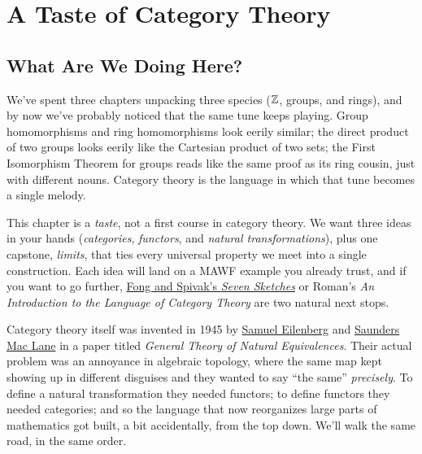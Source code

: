 

\chapter{A Taste of Category Theory}

\section{What Are We Doing Here?}\label{sec:ch4-intro}
We've spent three chapters unpacking three species (${\mathbb{Z}}$, groups, and rings), and by now
we've probably noticed that the same tune keeps playing. Group homomorphisms and ring
homomorphisms look eerily similar; the direct product of two groups looks eerily like the
Cartesian product of two sets; the First Isomorphism Theorem for groups reads like the
same proof as its ring cousin, just with different nouns. Category theory is the language in
which that tune becomes a single melody.

This chapter is a \textit{taste}, not a first course in category theory. We want three
ideas in your hands (\textit{categories}, \textit{functors}, and \textit{natural
transformations}), plus one capstone, \textit{limits}, that ties every universal property we
meet into a single construction. Each idea will land on a MAWF example you already trust,
and if you want to go further,
\href{https://arxiv.org/abs/1803.05316}{Fong and Spivak's \textit{Seven Sketches}}
\cite{fong2018seven} or Roman's \textit{An Introduction to the Language of Category Theory}
\cite{roman2017introduction} are two natural next stops.

Category theory itself was invented in 1945 by
\href{https://en.wikipedia.org/wiki/Samuel_Eilenberg}{Samuel Eilenberg} and
\href{https://en.wikipedia.org/wiki/Saunders_Mac_Lane}{Saunders Mac Lane} in a paper titled
\textit{General Theory of Natural Equivalences}. Their actual problem was an annoyance in
algebraic topology, where the same map kept showing up in different disguises and they wanted
to say ``the same'' \textit{precisely}. To define a natural transformation they needed
functors; to define functors they needed categories; and so the language that now reorganizes
large parts of mathematics got built, a bit accidentally, from the top down. We'll walk the
same road, in the same order.

